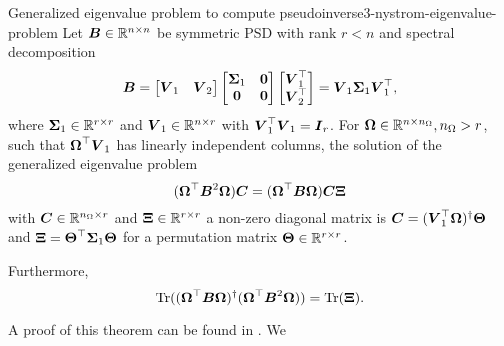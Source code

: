 \begin{theorem}{Generalized eigenvalue problem to compute pseudoinverse}{3-nystrom-eigenvalue-problem}
    Let $\boldsymbol{B} \in \mathbb{R}^{n \times n}$ be symmetric \gls{PSD} with rank $r < n$ and
    spectral decomposition 
    \begin{equation}
        \boldsymbol{B}
        = \begin{bmatrix} \boldsymbol{V}_1 & \boldsymbol{V}_2 \end{bmatrix} 
          \begin{bmatrix} \boldsymbol{\Sigma}_1 & \boldsymbol{0} \\ \boldsymbol{0} & \boldsymbol{0} \end{bmatrix} 
          \begin{bmatrix} \boldsymbol{V}_1^{\top} \\ \boldsymbol{V}_2^{\top} \end{bmatrix}
        = \boldsymbol{V}_1 \boldsymbol{\Sigma}_1 \boldsymbol{V}_1^{\top},
        \label{equ:3-nystrom-eigenvalue-problem-spectral-decomposition}
    \end{equation}
    where $\boldsymbol{\Sigma}_1 \in \mathbb{R}^{r \times r}$ and
    $\boldsymbol{V}_1 \in \mathbb{R}^{n \times r}$ with $\boldsymbol{V}_1^{\top} \boldsymbol{V}_1 = \boldsymbol{I}_r$.
    For $\boldsymbol{\Omega} \in \mathbb{R}^{n \times n_{\Omega}}, n_{\Omega} > r$,
    such that $\boldsymbol{\Omega}^{\top} \boldsymbol{V}_1$ has linearly independent columns,
    the solution of the generalized eigenvalue problem
    \begin{equation}
        (\boldsymbol{\Omega}^{\top} \boldsymbol{B}^2 \boldsymbol{\Omega}) \boldsymbol{C} = (\boldsymbol{\Omega}^{\top} \boldsymbol{B} \boldsymbol{\Omega}) \boldsymbol{C}  \boldsymbol{\Xi}
        \label{equ:3-nystrom-low-rank-eigenvalue-problem}
    \end{equation}
    with $\boldsymbol{C} \in \mathbb{R}^{n_{\Omega} \times r}$ and $\boldsymbol{\Xi} \in \mathbb{R}^{r \times r}$ a 
    non-zero diagonal matrix is $\boldsymbol{C} = (\boldsymbol{V}_1^{\top} \boldsymbol{\Omega})^{\dagger} \boldsymbol{\Theta}$
    and $\boldsymbol{\Xi} = \boldsymbol{\Theta}^{\top} \boldsymbol{\Sigma}_1 \boldsymbol{\Theta}$
    for a permutation matrix $\boldsymbol{\Theta} \in \mathbb{R}^{r \times r}$.

    Furthermore,
    \begin{equation}
        \operatorname{Tr}((\boldsymbol{\Omega}^{\top} \boldsymbol{B} \boldsymbol{\Omega})^{\dagger}(\boldsymbol{\Omega}^{\top} \boldsymbol{B}^2 \boldsymbol{\Omega})) = \operatorname{Tr}(\boldsymbol{\Xi}).
        \label{equ:3-nystrom-low-rank-trace-equalities}
    \end{equation}
\end{theorem}
A proof of this theorem can be found in \cite[theorem~3]{lin2017randomized}. We
